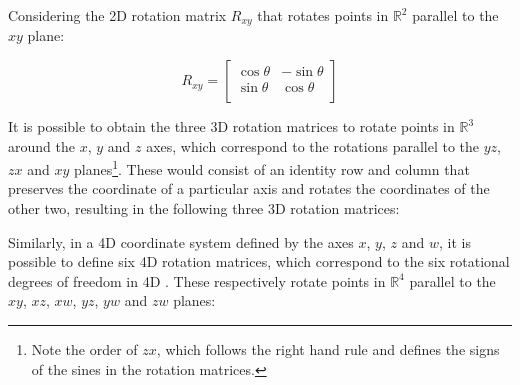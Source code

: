 Considering the 2D rotation matrix $R_{xy}$ that rotates points in $\mathbb{R}^2$ parallel to the $xy$ plane:

\begin{equation*}
R_{xy} = \begin{bmatrix}
\cos \theta & -\sin \theta \\
\sin \theta & \cos \theta \\
\end{bmatrix}
\end{equation*}

It is possible to obtain the three 3D rotation matrices to rotate points in $\mathbb{R}^3$ around the $x$, $y$ and $z$ axes, which correspond to the rotations parallel to the $yz$, $zx$ and $xy$ planes\footnote{Note the order of $zx$, which follows the right hand rule and defines the signs of the sines in the rotation matrices.}.
These would consist of an identity row and column that preserves the coordinate of a particular axis and rotates the coordinates of the other two, resulting in the following three 3D rotation matrices:

\hspace{-\marginparwidth}\hspace{-\marginparsep}

Similarly, in a 4D coordinate system defined by the axes $x$, $y$, $z$ and $w$, it is possible to define six 4D rotation matrices, which correspond to the six rotational degrees of freedom in 4D \citep{Hanson94}.
These respectively rotate points in $\mathbb{R}^4$ parallel to the $xy$, $xz$, $xw$, $yz$, $yw$ and $zw$ planes:

